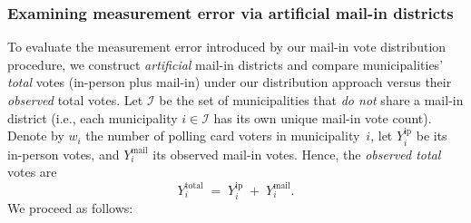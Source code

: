 \documentclass[12pt]{article}
\begin{document}
\subsubsection{Examining measurement error via artificial mail-in districts}
\label{sec:artificial_districts}

To evaluate the measurement error introduced by our mail-in vote distribution procedure, we construct \emph{artificial} mail-in districts and compare municipalities’ \emph{total} votes (in-person plus mail-in) under our distribution approach versus their \emph{observed} total votes. Let $\mathcal{I}$ be the set of municipalities that \emph{do not} share a mail-in district (i.e., each municipality $i \in \mathcal{I}$ has its own unique mail-in vote count). Denote by $w_i$ the number of polling card voters in municipality~$i$, let $Y_i^{\text{ip}}$ be its in-person votes, and $Y_i^{\text{mail}}$ its observed mail-in votes. Hence, the \emph{observed total} votes are 
\[
    Y_i^{\text{total}} \;=\; Y_i^{\text{ip}} \;+\; Y_i^{\text{mail}}.
\]
We proceed as follows:
\end{document}
